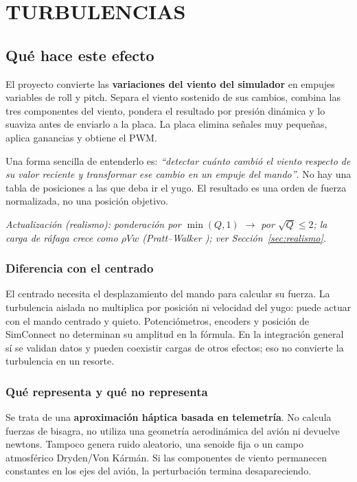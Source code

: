 \section{TURBULENCIAS}
\label{sec:turbulencias}

\subsection{Qué hace este efecto}
El proyecto convierte las \textbf{variaciones del viento del simulador} en empujes variables de roll y pitch. Separa el viento sostenido de sus cambios, combina las tres componentes del viento, pondera el resultado por presión dinámica y lo suaviza antes de enviarlo a la placa. La placa elimina señales muy pequeñas, aplica ganancias y obtiene el PWM.

Una forma sencilla de entenderlo es: \emph{``detectar cuánto cambió el viento respecto de su valor reciente y transformar ese cambio en un empuje del mando''}. No hay una tabla de posiciones a las que deba ir el yugo. El resultado es una orden de fuerza normalizada, no una posición objetivo.

\textit{Actualización (realismo): ponderación por $\min(Q,1)$ $\rightarrow$ por $\sqrt Q\le2$; la carga de ráfaga crece como $\rho Vw$ (Pratt--Walker \cite{pratt1954}); ver Sección~\ref{sec:realismo}.}

\subsubsection{Diferencia con el centrado}
El centrado necesita el desplazamiento del mando para calcular su fuerza. La turbulencia aislada no multiplica por posición ni velocidad del yugo: puede actuar con el mando centrado y quieto. Potenciómetros, encoders y posición de SimConnect no determinan su amplitud en la fórmula. En la integración general sí se validan datos y pueden coexistir cargas de otros efectos; eso no convierte la turbulencia en un resorte.

\subsubsection{Qué representa y qué no representa}
Se trata de una \textbf{aproximación háptica basada en telemetría}. No calcula fuerzas de bisagra, no utiliza una geometría aerodinámica del avión ni devuelve newtons. Tampoco genera ruido aleatorio, una senoide fija o un campo atmosférico Dryden/Von Kármán. Si las componentes de viento permanecen constantes en los ejes del avión, la perturbación termina desapareciendo.

